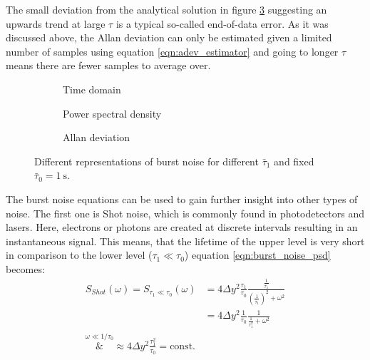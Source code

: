 The small deviation from the analytical solution in figure \ref{fig:burst_noise_adev} suggesting an upwards trend at large $\tau$ is a typical so-called end-of-data error. As it was discussed above, the Allan deviation can only be estimated given a limited number of samples using equation \ref{eqn:adev_estimator} and going to longer $\tau$ means there are fewer samples to average over.

\begin{figure}[ht]
    \centering
    \begin{subfigure}{0.8\linewidth}
        \centering
        \scalebox{1}{%
            
        } %
        \caption{Time domain}
        \label{fig:burst_noise_time}
    \end{subfigure}
    \begin{subfigure}{0.8\linewidth}
        \centering
        \scalebox{1}{%
            
        } %
        \caption{Power spectral density}
        \label{fig:burst_noise_psd}
    \end{subfigure}
    \begin{subfigure}{0.8\linewidth}
        \centering
        \scalebox{1}{%
            
        } %
        \caption{Allan deviation}
        \label{fig:burst_noise_adev}
    \end{subfigure}
    \caption{Different representations of burst noise for different $\bar \tau_1$ and fixed $\bar \tau_0 = \qty{1}{\s}$.}
    \label{fig:burst_noise_simulated}
\end{figure}

The burst noise equations can be used to gain further insight into other types of noise. The first one is Shot noise, which is commonly found in photodetectors and lasers. Here, electrons or photons are created at discrete intervals resulting in an instantaneous signal. This means, that the lifetime of the upper level is very short in comparison to the lower level ($\tau_1 \ll \tau_0$) equation \ref{eqn:burst_noise_psd} becomes:
\begin{align}
    S_{Shot}(\omega) = S_{\tau_1 \ll \tau_0}(\omega) &= 4 \Delta y^2 \frac{\tau_1}{\tau_0} \frac{\frac{1}{\bar \tau_1}}{\left(\frac{1}{\bar \tau_1}\right)^2 + \omega^2}\nonumber\\
    &= 4 \Delta y^2 \frac{1}{\tau_0} \frac{1}{\frac{1}{\tau_1^2}+\omega^2}\\
    \overset{\omega \ll 1/\tau_0}&{\approx} 4 \Delta y^2 \frac{\tau_1^2}{\tau_0} = \text{const.}
\end{align}

